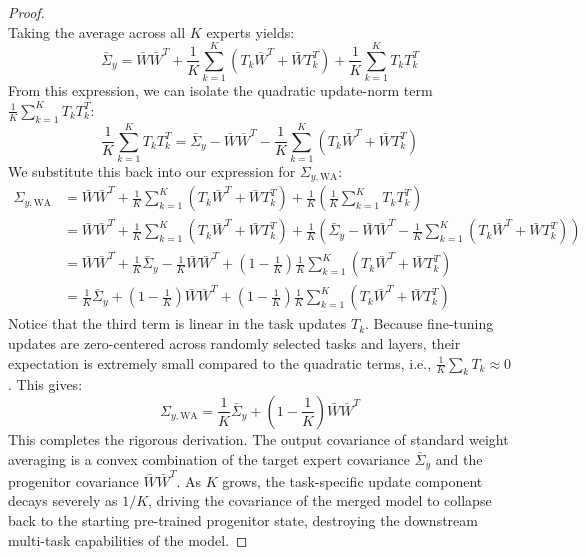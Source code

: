 \documentclass{article}
\theoremstyle{plain}
\theoremstyle{definition}
\theoremstyle{remark}
\begin{document}
\begin{proof}
\begin{equation}
\end{equation}
Taking the average across all $K$ experts yields:
\begin{equation}
\bar{\Sigma}_y = \bar{W} \bar{W}^T + \frac{1}{K} \sum_{k=1}^K \left( T_k \bar{W}^T + \bar{W} T_k^T \right) + \frac{1}{K} \sum_{k=1}^K T_k T_k^T
\end{equation}
From this expression, we can isolate the quadratic update-norm term $\frac{1}{K} \sum_{k=1}^K T_k T_k^T$:
\begin{equation}
\frac{1}{K} \sum_{k=1}^K T_k T_k^T = \bar{\Sigma}_y - \bar{W} \bar{W}^T - \frac{1}{K} \sum_{k=1}^K \left( T_k \bar{W}^T + \bar{W} T_k^T \right)
\end{equation}
We substitute this back into our expression for $\Sigma_{y, \text{WA}}$:
\begin{align}
\Sigma_{y, \text{WA}} &= \bar{W} \bar{W}^T + \frac{1}{K} \sum_{k=1}^K \left( T_k \bar{W}^T + \bar{W} T_k^T \right) + \frac{1}{K} \left( \frac{1}{K} \sum_{k=1}^K T_k T_k^T \right) \\
&= \bar{W} \bar{W}^T + \frac{1}{K} \sum_{k=1}^K \left( T_k \bar{W}^T + \bar{W} T_k^T \right) + \frac{1}{K} \left( \bar{\Sigma}_y - \bar{W} \bar{W}^T - \frac{1}{K} \sum_{k=1}^K \left( T_k \bar{W}^T + \bar{W} T_k^T \right) \right) \\
&= \bar{W} \bar{W}^T + \frac{1}{K} \bar{\Sigma}_y - \frac{1}{K} \bar{W} \bar{W}^T + \left( 1 - \frac{1}{K} \right) \frac{1}{K} \sum_{k=1}^K \left( T_k \bar{W}^T + \bar{W} T_k^T \right) \\
&= \frac{1}{K} \bar{\Sigma}_y + \left( 1 - \frac{1}{K} \right) \bar{W} \bar{W}^T + \left( 1 - \frac{1}{K} \right) \frac{1}{K} \sum_{k=1}^K \left( T_k \bar{W}^T + \bar{W} T_k^T \right)
\end{align}
Notice that the third term is linear in the task updates $T_k$. Because fine-tuning updates are zero-centered across randomly selected tasks and layers, their expectation is extremely small compared to the quadratic terms, i.e., $\frac{1}{K} \sum_k T_k \approx 0$. This gives:
\begin{equation}
\Sigma_{y, \text{WA}} = \frac{1}{K} \bar{\Sigma}_y + \left(1 - \frac{1}{K}\right) \bar{W} \bar{W}^T
\end{equation}
This completes the rigorous derivation. The output covariance of standard weight averaging is a convex combination of the target expert covariance $\bar{\Sigma}_y$ and the progenitor covariance $\bar{W}\bar{W}^T$. As $K$ grows, the task-specific update component decays severely as $1/K$, driving the covariance of the merged model to collapse back to the starting pre-trained progenitor state, destroying the downstream multi-task capabilities of the model.
\end{proof}
\end{document}
